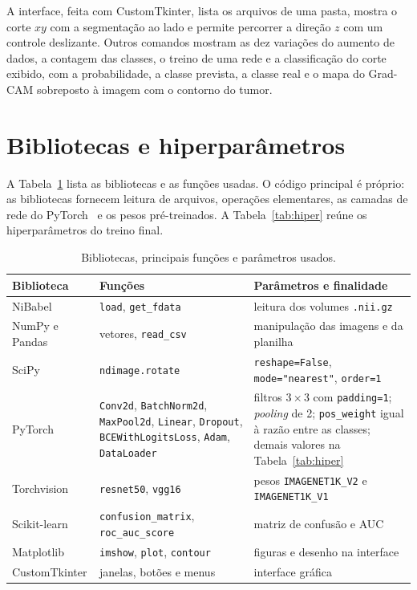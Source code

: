 \documentclass[12pt]{article}
\begin{document}
A interface, feita com CustomTkinter, lista os arquivos de uma pasta, mostra o corte $xy$ com a
segmentação ao lado e permite percorrer a direção $z$ com um controle deslizante. Outros comandos mostram
as dez variações do aumento de dados, a contagem das classes, o treino de uma rede e a classificação do
corte exibido, com a probabilidade, a classe prevista, a classe real e o mapa do Grad-CAM sobreposto à
imagem com o contorno do tumor.

\section{Bibliotecas e hiperparâmetros}
\label{sec:bibliotecas}

A Tabela~\ref{tab:bibliotecas} lista as bibliotecas e as funções usadas. O código principal é próprio:
as bibliotecas fornecem leitura de arquivos, operações elementares, as camadas de rede do
PyTorch~\cite{paszke2019} e os pesos pré-treinados. A Tabela~\ref{tab:hiper} reúne os hiperparâmetros do
treino final.

\begin{table}[ht]
\centering
\caption{Bibliotecas, principais funções e parâmetros usados.}
\label{tab:bibliotecas}
\footnotesize
\setlength{\tabcolsep}{4pt}
\begin{tabular}{@{}p{2.1cm}>{\raggedright\arraybackslash}p{5.5cm}>{\raggedright\arraybackslash}p{6.6cm}@{}}
\toprule
Biblioteca & Funções & Parâmetros e finalidade \\
\midrule
NiBabel & \texttt{load}, \texttt{get\_fdata} & leitura dos volumes \texttt{.nii.gz} \\
NumPy e Pandas & vetores, \texttt{read\_csv} & manipulação das imagens e da planilha \\
SciPy & \texttt{ndimage.rotate} & \texttt{reshape=False}, \texttt{mode="nearest"}, \texttt{order=1} \\
PyTorch & \texttt{Conv2d}, \texttt{BatchNorm2d}, \texttt{MaxPool2d}, \texttt{Linear}, \texttt{Dropout}, \texttt{BCEWithLogitsLoss}, \texttt{Adam}, \texttt{DataLoader} & filtros $3{\times}3$ com \texttt{padding=1}; \textit{pooling} de 2; \texttt{pos\_weight} igual à razão entre as classes; demais valores na Tabela~\ref{tab:hiper} \\
Torchvision & \texttt{resnet50}, \texttt{vgg16} & pesos \texttt{IMAGENET1K\_V2} e \texttt{IMAGENET1K\_V1} \\
Scikit-learn & \texttt{confusion\_matrix}, \texttt{roc\_auc\_score} & matriz de confusão e AUC \\
Matplotlib & \texttt{imshow}, \texttt{plot}, \texttt{contour} & figuras e desenho na interface \\
CustomTkinter & janelas, botões e menus & interface gráfica \\
\bottomrule
\end{tabular}
\end{table}
\end{document}

